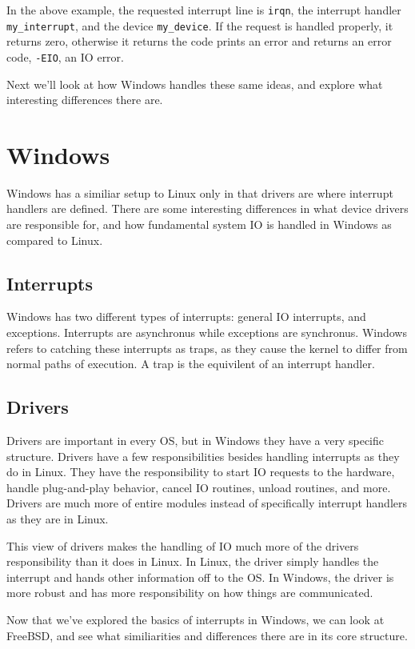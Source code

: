   In the above example, the requested interrupt line is \texttt{irqn}, the
  interrupt handler \texttt{my\_interrupt}, and the device \texttt{my\_device}.
  If the request is handled properly, it returns zero, otherwise it returns the
  code prints an error and returns an error code, \texttt{-EIO}, an IO error.
  \cite{robertlove2010}

  Next we'll look at how Windows handles these same ideas, and explore what
  interesting differences there are.

  \section{Windows}
  Windows has a similiar setup to Linux only in that drivers are where interrupt
  handlers are defined. There are some interesting differences in what device
  drivers are responsible for, and how fundamental system IO is handled in Windows
  as compared to Linux.
  \subsection{Interrupts}
  Windows has two different types of interrupts: general IO interrupts, and
  exceptions. Interrupts are asynchronus while exceptions are synchronus. Windows
  refers to catching these interrupts as traps, as they cause the kernel to differ
  from normal paths of execution. A trap is the equivilent of an interrupt handler.
  \cite{internals1}
  \subsection{Drivers}
  Drivers are important in every OS, but in Windows they have a very specific
  structure. Drivers have a few responsibilities besides handling interrupts as
  they do in Linux. They have the responsibility to start IO requests to the hardware,
  handle plug-and-play behavior, cancel IO routines, unload routines, and more.
  Drivers are much more of entire modules instead of specifically interrupt handlers
  as they are in Linux. \cite{internals2}

  This view of drivers makes the handling of IO much more of the drivers responsibility
  than it does in Linux. In Linux, the driver simply handles the interrupt and hands
  other information off to the OS. In Windows, the driver is more robust and has
  more responsibility on how things are communicated.

  Now that we've explored the basics of interrupts in Windows, we can look at
  FreeBSD, and see what similiarities and differences there are in its core structure.


